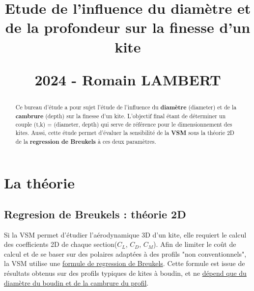\documentclass[conference]{IEEEtran}
\begin{document}
\title{\LARGE Etude de l'influence du diamètre et de la profondeur sur la finesse d'un kite
\vskip10pt

\small 2024 - Romain LAMBERT
}
\maketitle

\begin{abstract}Ce bureau d'étude a pour sujet l'étude de l'influence du \textbf{diamètre} (diameter) et de la \textbf{cambrure} (depth) sur la finesse d'un kite. L'objectif final étant de déterminer un couple (t,k) = (diameter, depth) qui serve de référence pour le dimensionnement des kites. Aussi, cette étude permet d'évaluer la sensibilité de la \textbf{VSM} sous la théorie 2D de la \textbf{regression de Breukels} à ces deux paramètres.
\end{abstract}
\IEEEoverridecommandlockouts

\IEEEpeerreviewmaketitle
\section{La théorie}

\subsection{\textbf{Regresion de Breukels : théorie 2D}} 

Si la VSM permet d'étudier l'aérodynamique 3D d'un kite, elle requiert le calcul des coefficients 2D de chaque section($C_L$, $C_D$, $C_M$). Afin de limiter le coût de calcul et de se baser sur des polaires adaptées à des profils "non conventionnels", la VSM utilise une \underline{formule de regression de Breukels}. 
Cette formule est issue de résultats obtenus sur des profils typiques de kites à boudin, et ne \underline{dépend que du diamètre du boudin et de la cambrure du profil}. \\
\end{document}
